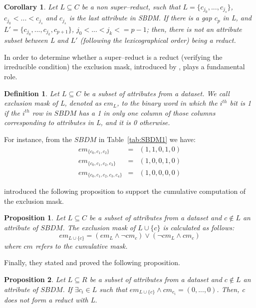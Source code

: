 \documentclass[authoryear,preprint,review,12pt]{elsarticle}
\newtheorem{proposition}{Proposition}
\newtheorem{definition}{Definition}
\newtheorem{corollary}{Corollary}
\begin{document}
	\begin{corollary}\label{coro:gap} 
		Let $L \subseteq C$ be a non super--reduct, such that $L = \lbrace c_{j_0},...,c_{j_s}\rbrace$, 
		$c_{j_0}<...<c_{j_s}$ and $c_{j_s}$ is the last attribute in SBDM. If there is a gap $c_p$ in L, and 
		$L' = \lbrace c_{j_0},...,c_{j_k},c_{p+1}\rbrace$, $j_0<...<j_k<=p-1$; then, there is not an attribute 
		subset between L and $L'$ (following the lexicographical order) being a reduct.
	\end{corollary}
		
	In order to determine whether a super--reduct is a reduct (verifying the irreducible condition) the
	exclusion mask, introduced by \cite{Lias09}, plays a fundamental role. 
	
	\begin{definition}\label{def:exclusion}
		Let $L \subseteq C$ be a subset of attributes from a dataset. We call exclusion mask of L, denoted as 
		$em_L$, to the binary word in which the $i^{\mathit{th}}$ bit is 1 if the $i^{\mathit{th}}$ row in $SBDM$
		has a 1 in only one 	column of those columns corresponding to attributes in L, and it is 0 otherwise.
	\end{definition}
	
	For instance, from the $SBDM$ in Table~\ref{tab:SBDM1} we have:
	$$\begin{array}{lcc}
	  em_{\lbrace c_0,c_1,c_2\rbrace}         &=& (1,1,0,1,0)\\
	  em_{\lbrace c_0,c_1,c_2,c_3\rbrace}     &=& (1,0,0,1,0)\\
	  em_{\lbrace c_0,c_1,c_2,c_3,c_4\rbrace} &=& (1,0,0,0,0)
	\end{array}$$
	
	\cite{Lias13} introduced the following proposition to support the cumulative computation of the exclusion mask.
	
	\begin{proposition}\label{prop:cumul} 
		Let $L \subseteq C$ be a subset of attributes from a dataset and $c \notin L$ an attribute of $SBDM$.
		The exclusion mask of $L \cup \lbrace c\rbrace$ is calculated as follows:
		$$em_{L \cup \lbrace c\rbrace}=(em_L \wedge \neg cm_c) \vee (\neg cm_L \wedge cm_c)$$
		where $cm$ refers to the cumulative mask.
	\end{proposition}
	
	Finally, they stated and proved the following proposition.
	
	\begin{proposition}\label{prop:exclude} 
		Let $L \subseteq R$ be a subset of attributes from a dataset and $c \notin L$ an attribute of $SBDM$.
		If $\exists c_i \in L$ such that $em_{L \cup \lbrace c\rbrace} \wedge cm_{c_i}=(0,...,0)$. Then, c
		does not form a reduct with L.
	\end{proposition}
\end{document}
